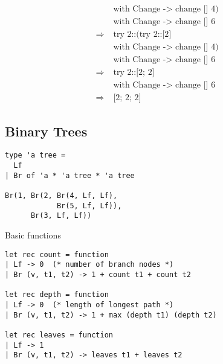 \documentclass[12pt,a4paper]{article} %
\begin{document}
$$\begin{aligned}
              &\; \text{with Change -> change [] 4)}\\
              &\; \text{with Change -> change [] 6} \\
  \Rightarrow &\; \text{try 2::(try 2::[2]}\\
              &\; \text{with Change -> change [] 4)}\\
              &\; \text{with Change -> change [] 6} \\
  \Rightarrow &\; \text{try 2::[2; 2]}\\
              &\; \text{with Change -> change [] 6} \\
  \Rightarrow &\; \text{[2; 2; 2]} 
\end{aligned}
$$
\subsection{Binary Trees}
\begin{lstlisting}[language=caml]
type 'a tree =
  Lf
| Br of 'a * 'a tree * 'a tree

Br(1, Br(2, Br(4, Lf, Lf),
            Br(5, Lf, Lf)),
      Br(3, Lf, Lf))
\end{lstlisting}
Basic functions
\begin{lstlisting}[language=caml]
let rec count = function
| Lf -> 0  (* number of branch nodes *)
| Br (v, t1, t2) -> 1 + count t1 + count t2

let rec depth = function
| Lf -> 0  (* length of longest path *)
| Br (v, t1, t2) -> 1 + max (depth t1) (depth t2)

let rec leaves = function
| Lf -> 1
| Br (v, t1, t2) -> leaves t1 + leaves t2
\end{lstlisting}
\end{document}
